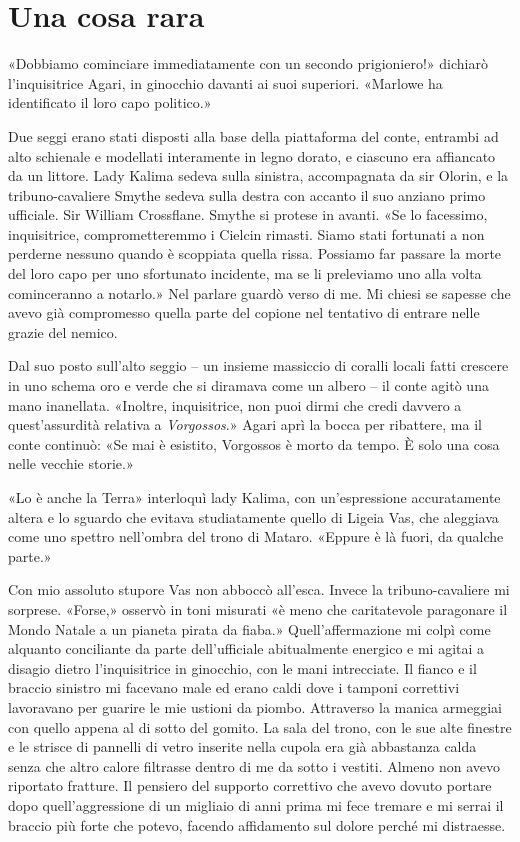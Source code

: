 \chapter{Una cosa rara}

«Dobbiamo cominciare immediatamente con un secondo prigioniero!»
dichiarò l'inquisitrice Agari, in ginocchio davanti ai suoi superiori.
«Marlowe ha identificato il loro capo politico.»

Due seggi erano stati disposti alla base della piattaforma del conte,
entrambi ad alto schienale e modellati interamente in legno dorato, e
ciascuno era affiancato da un littore. Lady Kalima sedeva sulla
sinistra, accompagnata da sir Olorin, e la tribuno-cavaliere Smythe
sedeva sulla destra con accanto il suo anziano primo ufficiale. Sir
William Crossflane. Smythe si protese in avanti. «Se lo facessimo,
inquisitrice, comprometteremmo i Cielcin rimasti. Siamo stati fortunati
a non perderne nessuno quando è scoppiata quella rissa. Possiamo far
passare la morte del loro capo per uno sfortunato incidente, ma se li
preleviamo uno alla volta cominceranno a notarlo.» Nel parlare guardò
verso di me. Mi chiesi se sapesse che avevo già compromesso quella parte
del copione nel tentativo di entrare nelle grazie del nemico.

Dal suo posto sull'alto seggio -- un insieme massiccio di coralli locali
fatti crescere in uno schema oro e verde che si diramava come un albero
-- il conte agitò una mano inanellata. «Inoltre, inquisitrice, non puoi
dirmi che credi davvero a quest'assurdità relativa a \emph{Vorgossos}.»
Agari aprì la bocca per ribattere, ma il conte continuò: «Se mai è
esistito, Vorgossos è morto da tempo. È solo una cosa nelle vecchie
storie.»

«Lo è anche la Terra» interloquì lady Kalima, con un'espressione
accuratamente altera e lo sguardo che evitava studiatamente quello di
Ligeia Vas, che aleggiava come uno spettro nell'ombra del trono di
Mataro. «Eppure è là fuori, da qualche parte.»

Con mio assoluto stupore Vas non abboccò all'esca. Invece la
tribuno-cavaliere mi sorprese. «Forse,» osservò in toni misurati «è meno
che caritatevole paragonare il Mondo Natale a un pianeta pirata da
fiaba.» Quell'affermazione mi colpì come alquanto conciliante da parte
dell'ufficiale abitualmente energico e mi agitai a disagio dietro
l'inquisitrice in ginocchio, con le mani intrecciate. Il fianco e il
braccio sinistro mi facevano male ed erano caldi dove i tamponi
correttivi lavoravano per guarire le mie ustioni da piombo. Attraverso
la manica armeggiai con quello appena al di sotto del gomito. La sala
del trono, con le sue alte finestre e le strisce di pannelli di vetro
inserite nella cupola era già abbastanza calda senza che altro calore
filtrasse dentro di me da sotto i vestiti. Almeno non avevo riportato
fratture. Il pensiero del supporto correttivo che avevo dovuto portare
dopo quell'aggressione di un migliaio di anni prima mi fece tremare e mi
serrai il braccio più forte che potevo, facendo affidamento sul dolore
perché mi distraesse.

